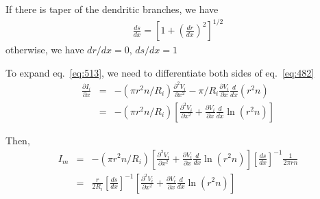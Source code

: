 If there is taper of the dendritic branches, we have 
\begin{eqnarray}
  \label{eq:485}
  \frac{ds}{dx} = \left[ 1 + \left( \frac{dr}{dx}\right)^2 \right]^{1/2}
\end{eqnarray}
otherwise, we have $dr/dx = 0$, $ds/dx = 1$


To expand eq.~\eqref{eq:513}, we need to differentiate both sides of
eq.~\eqref{eq:482}
\begin{eqnarray}
  \label{eq:487}
  \frac{\partial I_i}{\partial x} &=& - (\pi r^2 n/R_i) 
    \frac{\partial^2V_i}{\partial x^2} - \pi/R_i \frac{\partial
      V_i}{\partial x} \frac{d}{dx}(r^2n) \\
    &=& - (\pi r^2 n/R_i) \left[
    \frac{\partial^2V_i}{\partial x^2} + \frac{\partial V_i}{\partial
      x} \frac{d}{dx}\ln(r^2n)\right]
\end{eqnarray}

Then,
\begin{eqnarray}
  \label{eq:435}
  I_m    &=& - (\pi r^2 n/R_i) \left[
    \frac{\partial^2V_i}{\partial x^2} + \frac{\partial V_i}{\partial
      x} \frac{d}{dx}\ln(r^2n)\right]
  \left[\frac{ds}{dx}\right]^{-1}\frac{1}{2\pi rn}\\ 
  &=& \frac{r}{2R_i} \left[\frac{ds}{dx}\right]^{-1} \left[
    \frac{\partial^2V_i}{\partial x^2} + \frac{\partial V_i}{\partial
      x} \frac{d}{dx}\ln(r^2n)\right]
\end{eqnarray}


